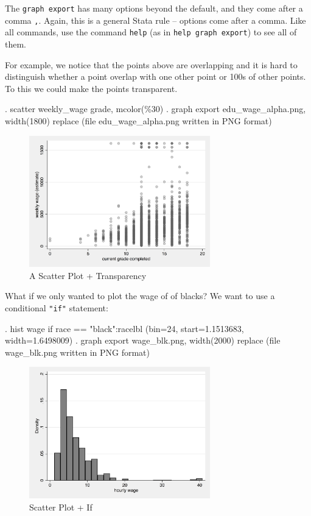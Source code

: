 \documentclass[]{article}
\begin{document}
The \texttt{graph\ export} has many options beyond the default, and they
come after a comma \texttt{,}. Again, this is a general Stata rule --
options come after a comma. Like all commands, use the command
\texttt{help} (as in \texttt{help\ graph\ export}) to see all of them.

For example, we notice that the points above are overlapping and it is
hard to distinguish whether a point overlap with one other point or 100s
of other points. To this we could make the points transparent.

\begin{stlog}
. scatter weekly_wage grade, mcolor(\%30)
{\smallskip}
. graph export edu_wage_alpha.png, width(1800) replace
(file edu_wage_alpha.png written in PNG format)
{\smallskip}
\end{stlog}

\begin{figure}
\centering
\includegraphics[width=0.70000\textwidth]{edu_wage_alpha.png}
\caption{A Scatter Plot + Transparency}
\end{figure}

What if we only wanted to plot the wage of of blacks? We want to use a
conditional \texttt{"if"} statement:

\begin{stlog}
. hist wage if race == "black":racelbl
(bin=24, start=1.1513683, width=1.6498009)
{\smallskip}
. graph export wage_blk.png, width(2000) replace
(file wage_blk.png written in PNG format)
{\smallskip}
\end{stlog}

\begin{figure}
\centering
\includegraphics[width=0.70000\textwidth]{wage_blk.png}
\caption{Scatter Plot + If}
\end{figure}
\end{document}
